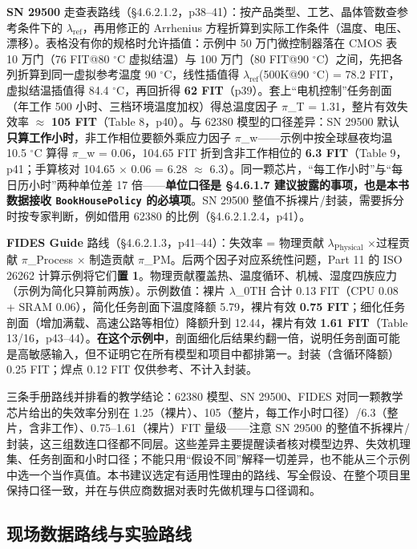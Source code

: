\textbf{SN 29500} 走查表路线（§4.6.2.1.2，p38–41）：按产品类型、工艺、晶体管数查参考条件下的 \(\lambda_{\mathrm{ref}}\)，再用修正的 Arrhenius 方程折算到实际工作条件（温度、电压、漂移）。表格没有你的规格时允许插值：示例中 50 万门微控制器落在 CMOS 表 10 万门（76 FIT@80 \(^{\circ}\)C 虚拟结温）与 100 万门（80 FIT@90 \(^{\circ}\)C）之间，先把各列折算到同一虚拟参考温度 90 \(^{\circ}\)C，线性插值得 \(\lambda_{\mathrm{ref}}\)(500K@90 \(^{\circ}\)C) = 78.2 FIT，虚拟结温插值得 84.4 \(^{\circ}\)C，再回折得 \textbf{62 FIT}（p39）。套上“电机控制”任务剖面（年工作 500 小时、三档环境温度加权）得总温度因子 \(\pi\)\_T = 1.31，整片有效失效率 \(\approx\) \textbf{105 FIT}（Table 8，p40）。与 62380 模型的口径差异：SN 29500 默认\textbf{只算工作小时}，非工作相位要额外乘应力因子 \(\pi\)\_w——示例中按全球昼夜均温 10.5 \(^{\circ}\)C 算得 \(\pi\)\_w = 0.06，104.65 FIT 折到含非工作相位的 \textbf{6.3 FIT}（Table 9，p41；手算核对 104.65 \(\times\) 0.06 = 6.28 \(\approx\) 6.3）。同一颗芯片，“每工作小时”与“每日历小时”两种单位差 17 倍——\textbf{单位口径是 §4.6.1.7 建议披露的事项，也是本书数据接收 \nolinkurl{BookHousePolicy} 的必填项}。SN 29500 整值不拆裸片/封装，需要拆分时按专家判断，例如借用 62380 的比例（§4.6.2.1.2.4，p41）。

\textbf{FIDES Guide} 路线（§4.6.2.1.3，p41–44）：失效率 = 物理贡献 \(\lambda_{\mathrm{Physical}}\) \(\times\)过程贡献 \(\pi\)\_Process \(\times\) 制造贡献 \(\pi\)\_PM。后两个因子对应系统性问题，Part 11 的 ISO 26262 计算示例将它们\textbf{置 1}。物理贡献覆盖热、温度循环、机械、湿度四族应力（示例为简化只算前两族）。示例数值：裸片 \(\lambda\)\_0TH 合计 0.13 FIT（CPU 0.08 + SRAM 0.06），简化任务剖面下温度降额 5.79，裸片有效 \textbf{0.75 FIT}；细化任务剖面（增加满载、高速公路等相位）降额升到 12.44，裸片有效 \textbf{1.61 FIT}（Table 13/16，p43–44）。\textbf{在这个示例中}，剖面细化后结果约翻一倍，说明任务剖面可能是高敏感输入，但不证明它在所有模型和项目中都排第一。封装（含循环降额）0.25 FIT；焊点 0.12 FIT 仅供参考、不计入封装。

三条手册路线并排看的教学结论：62380 模型、SN 29500、FIDES 对同一颗教学芯片给出的失效率分别在 1.25（裸片）、105（整片，每工作小时口径）/6.3（整片，含非工作）、0.75–1.61（裸片）FIT 量级——注意 SN 29500 的整值不拆裸片/封装，这三组数连口径都不同层。这些差异主要提醒读者核对模型边界、失效机理集、任务剖面和小时口径；不能只用“假设不同”解释一切差异，也不能从三个示例中选一个当作真值。本书建议选定有适用性理由的路线、写全假设、在整个项目里保持口径一致，并在与供应商数据对表时先做机理与口径调和。

\subsection{现场数据路线与实验路线}

